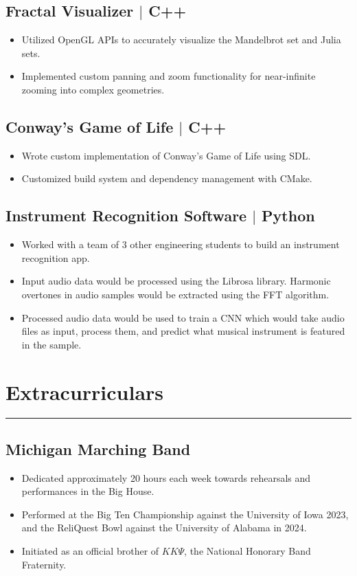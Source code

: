 \documentclass[10pt, letterpaper]{article}
\begin{document}
\subsection*{Fractal Visualizer $\vert$ C++}
\begin{itemize}[noitemsep]
    \item Utilized OpenGL APIs to accurately visualize the Mandelbrot set and Julia sets.
    \item Implemented custom panning and zoom functionality for near-infinite zooming into complex geometries.
\end{itemize}

\subsection*{Conway's Game of Life $\vert$ C++}
\begin{itemize}[noitemsep]
	\item Wrote custom implementation of Conway's Game of Life using SDL.
	\item Customized build system and dependency management with CMake.
\end{itemize}

\subsection*{Instrument Recognition Software $\vert$ Python}
\begin{itemize}[noitemsep]
	\item Worked with a team of 3 other engineering students to build an instrument recognition app.
	\item Input audio data would be processed using the Librosa library. Harmonic overtones in audio samples would be extracted using the FFT algorithm.
	\item Processed audio data would be used to train a CNN which would take audio files as input, process them,
	and predict what musical instrument is featured in the sample.
\end{itemize}

\section*{Extracurriculars}
\hrule
\vspace{3pt}

\subsection*{Michigan Marching Band}
\begin{itemize}[noitemsep]
	\item Dedicated approximately 20 hours each week towards rehearsals and performances in the Big House.
	\item Performed at the Big Ten Championship against the University of Iowa 2023,
		and the ReliQuest Bowl against the University of Alabama in 2024.
	\item Initiated as an official brother of $KK\Psi$, the National Honorary Band Fraternity.
\end{itemize}
\end{document}
